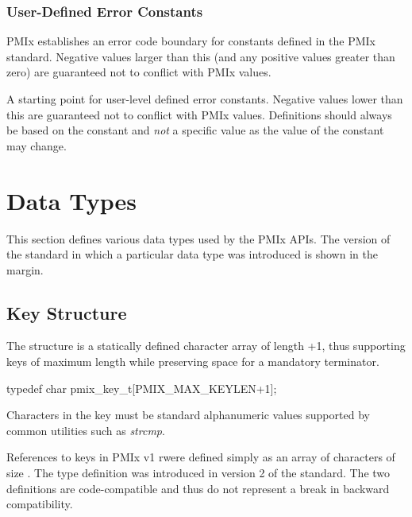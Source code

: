 \subsubsection{User-Defined Error Constants}

PMIx establishes an error code boundary for constants defined in the PMIx standard. Negative values larger than this (and any positive values greater than zero) are guaranteed not to conflict with PMIx values.

\begin{constantdesc}
%
A starting point for user-level defined error constants.
Negative values lower than this are guaranteed not to conflict with PMIx values.
Definitions should always be based on the  constant and \emph{not} a specific value as the value of the constant may change.
%
\end{constantdesc}



\section{Data Types}

This section defines various data types used by the PMIx APIs. The version of the standard in which a particular data type was introduced is shown in the margin.

\subsection{Key Structure}

The  structure is a statically defined character array of length +1, thus supporting keys of maximum length  while preserving space for a mandatory  terminator.

\cspecificstart
\begin{codepar}
typedef char pmix_key_t[PMIX_MAX_KEYLEN+1];
\end{codepar}
\cspecificend

Characters in the key must be standard alphanumeric values supported by common utilities such as \textit{strcmp}.

\adviceuserstart
References to keys in \ac{PMIx} v1 rwere defined simply as an array of characters of size . The  type definition was introduced in version 2 of the standard. The two definitions are code-compatible and thus do not represent a break in backward compatibility.

